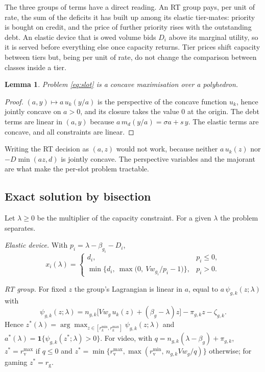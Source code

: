 \documentclass[preprint,11pt]{elsarticle}
\newtheorem{lemma}{Lemma}
\theoremstyle{definition}
\theoremstyle{remark}
\newcommand{\rmin}{r^{\min}}
\newcommand{\rmax}{r^{\max}}
\newcommand{\ind}{\mathbf{1}}
\begin{document}
The three groups of terms have a direct reading.
An RT group pays, per unit of rate, the sum of the deficits it has built up among its elastic tier-mates: priority is bought on credit, and the price of further priority rises with the outstanding debt.
An elastic device that is owed volume bids $D_i$ above its marginal utility, so it is served before everything else once capacity returns.
Tier prices shift capacity between tiers but, being per unit of rate, do not change the comparison between classes inside a tier.

\begin{lemma}\label{lem:concave}
Problem \eqref{eq:slot} is a concave maximisation over a polyhedron.
\end{lemma}
\begin{proof}
$(a,y)\mapsto a\,u_k(y/a)$ is the perspective of the concave function $u_k$, hence jointly concave on $a>0$, and its closure takes the value $0$ at the origin.
The debt terms are linear in $(a,y)$ because $a\,m_d(y/a)=\sigma a+s\,y$.
The elastic terms are concave, and all constraints are linear.
\end{proof}

Writing the RT decision as $(a,z)$ would not work, because neither $a\,u_k(z)$ nor $-D\min(az,d)$ is jointly concave.
The perspective variables and the majorant are what make the per-slot problem tractable.

\subsection{Exact solution by bisection}

Let $\lambda\ge 0$ be the multiplier of the capacity constraint.
For a given $\lambda$ the problem separates.

\emph{Elastic device.} With $p_i=\lambda-\beta_{g_i}-D_i$,
\begin{equation}\label{eq:xresp}
x_i(\lambda)=\begin{cases}d_i, & p_i\le 0,\\
\min\big\{d_i,\ \max\big(0,\ V w_{g_i}/p_i-1\big)\big\}, & p_i>0 .\end{cases}
\end{equation}

\emph{RT group.} For fixed $z$ the group's Lagrangian is linear in $a$, equal to $a\,\psi_{g,k}(z;\lambda)$ with
\begin{equation}\label{eq:psi}
\psi_{g,k}(z;\lambda)=n_{g,k}\big[V w_g\,u_k(z)+(\beta_g-\lambda)z\big]-\pi_{g,k}z-\zeta_{g,k}.
\end{equation}
Hence $z^*(\lambda)=\arg\max_{z\in[\rmin_k,\rmax_k]}\psi_{g,k}(z;\lambda)$ and $a^*(\lambda)=\ind\{\psi_{g,k}(z^*;\lambda)>0\}$.
For video, with $q=n_{g,k}(\lambda-\beta_g)+\pi_{g,k}$, $z^*=\rmax_{\mathrm{v}}$ if $q\le 0$ and $z^*=\min\{\rmax_{\mathrm{v}},\max(\rmin_{\mathrm{v}},\,n_{g,k}Vw_g/q)\}$ otherwise; for gaming $z^*=r_{\mathrm{g}}$.
\end{document}

